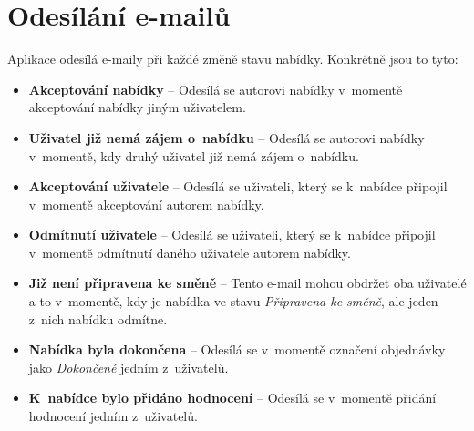 \section{Odesílání e-mailů}

\label{nur:mail}

Aplikace odesílá e-maily při každé změně stavu nabídky. Konkrétně jsou to tyto:
\begin{itemize}
    \item \textbf{Akceptování nabídky} -- Odesílá se autorovi nabídky v~momentě akceptování nabídky jiným uživatelem.
    \item \textbf{Uživatel již nemá zájem o~nabídku} -- Odesílá se autorovi nabídky v~momentě, kdy druhý uživatel již nemá zájem o~nabídku.
    \item \textbf{Akceptování uživatele} -- Odesílá se uživateli, který se k~nabídce připojil v~momentě akceptování autorem nabídky.
    \item \textbf{Odmítnutí uživatele} -- Odesílá se uživateli, který se k~nabídce připojil v~momentě odmítnutí daného uživatele autorem nabídky.
    \item \textbf{Již není připravena ke směně} -- Tento e-mail mohou obdržet oba uživatelé a to v~momentě, kdy je nabídka ve stavu \textit{Připravena ke směně}, ale jeden z~nich nabídku odmítne.
    \item \textbf{Nabídka byla dokončena} -- Odesílá se v~momentě označení objednávky jako \textit{Dokončené} jedním z~uživatelů.
    \item \textbf{K~nabídce bylo přidáno hodnocení} -- Odesílá se v~momentě přidání hodnocení jedním z~uživatelů.
\end{itemize}
